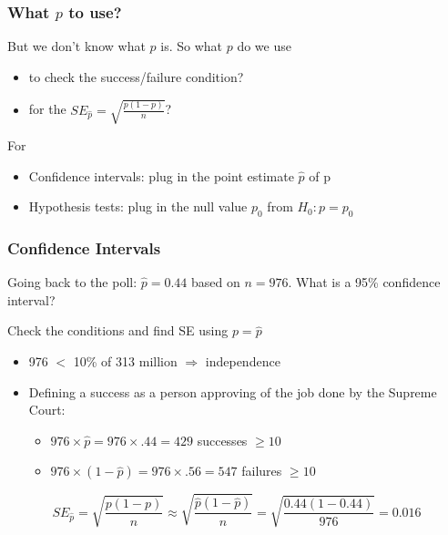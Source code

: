 \documentclass[slides]{beamer}
\newcommand{\blue}[1]{\textcolor{blue2}{#1}}
\newcommand{\phat}{\widehat{p}}
\begin{document}
\begin{frame}[fragile]
\frametitle{What $p$ to use?}

%
%
But we \blue{don't know} what $p$ is.  So what $p$ do we use
\begin{itemize}
\item to check the success/failure condition?
\item for the $SE_{\phat} = \sqrt{\frac{p(1-p)}{n}}$?
\end{itemize}

\vspace{0.5cm}
For
\begin{itemize}
\pause \item Confidence intervals: plug in the \blue{point estimate} $\phat$ of p
\pause \item Hypothesis tests: plug in the \blue{null value} $p_0$ from $H_0: p=p_0$
\end{itemize}

\end{frame}


\begin{frame}[fragile]
\frametitle{Confidence Intervals}

%
%
Going back to the poll: $\phat=0.44$ based on $n=976$.  What is a 95\% confidence interval?

\vspace{0.25cm}

\pause Check the conditions and find SE \blue{using $p=\phat$}

\begin{itemize}
\pause \item 976 $<$ 10\% of 313 million $\Rightarrow$ independence
\pause \item Defining a success as a person approving of the job done by the Supreme Court:
\pause
\begin{itemize}
\item $976 \times \phat = 976 \times .44 = 429$ successes $\geq 10$
\item $976 \times (1-\phat) = 976 \times .56 = 547$ failures $\geq 10$
\end{itemize}
\end{itemize}
\pause
\[
SE_{\phat} = \sqrt{\frac{p(1-p)}{n}} \approx \sqrt{\frac{\phat(1-\phat)}{n}} = \sqrt{\frac{0.44(1-0.44)}{976}} = 0.016
\]
\end{frame}
\end{document}
